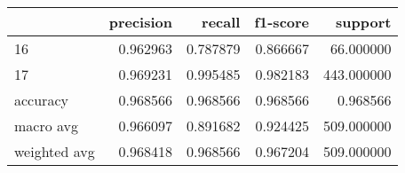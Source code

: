 \begin{tabular}{lrrrr}
\toprule
 & precision & recall & f1-score & support \\
\midrule
16 & 0.962963 & 0.787879 & 0.866667 & 66.000000 \\
17 & 0.969231 & 0.995485 & 0.982183 & 443.000000 \\
accuracy & 0.968566 & 0.968566 & 0.968566 & 0.968566 \\
macro avg & 0.966097 & 0.891682 & 0.924425 & 509.000000 \\
weighted avg & 0.968418 & 0.968566 & 0.967204 & 509.000000 \\
\bottomrule
\end{tabular}
